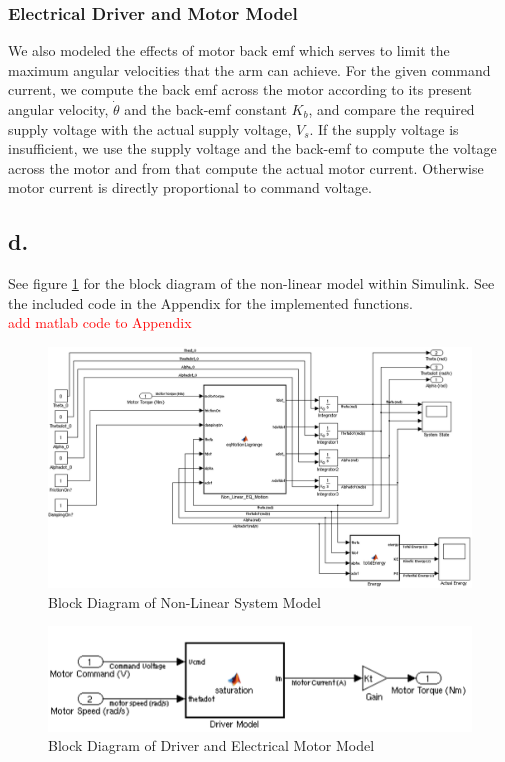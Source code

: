 \documentclass{article}
\newcommand{\xxx}[1]{\textcolor{red}{#1}}
\theoremstyle{plain}
\theoremstyle{definition}
\theoremstyle{remark}
\begin{document}
\subsubsection*{Electrical Driver and Motor Model}

We also modeled the effects of motor back emf which serves to limit the maximum angular velocities that the arm can achieve. For the given command current, we compute the back emf across the motor according to its present angular velocity, $\dot{\theta}$ and the back-emf constant $K_b$, and compare the required supply voltage with the actual supply voltage, $V_{s}$.  If the supply voltage is insufficient, we use the supply voltage and the back-emf to compute the voltage across the motor and from that compute the actual motor current.  Otherwise motor current is directly proportional to command voltage. 

\subsection*{d.}
See figure \ref{NonLinearBlock} for the block diagram of the non-linear model within Simulink.  See the included code in the Appendix for the implemented functions. \\
\xxx{add matlab code to Appendix}

\begin{figure}
\begin{center}
\includegraphics[width = 15cm]{NonLinearModelPic.png}
\end{center}
\caption{Block Diagram of Non-Linear System Model}
\label{NonLinearBlock}
\end{figure}

\begin{figure}
\begin{center}
\includegraphics[width = 12cm]{DriverandMotorModel.png}
\end{center}
\caption{Block Diagram of Driver and Electrical Motor Model}
\label{DriverNonLinearBlock}
\end{figure}
\end{document}
